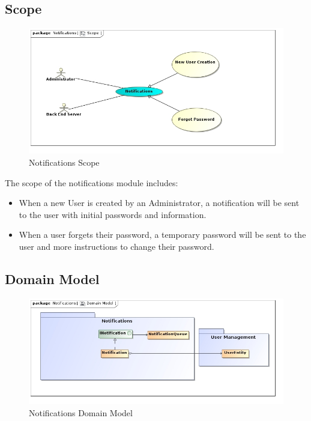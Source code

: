 \documentclass[11pt,a4paper]{article}
\begin{document}
\subsection{Scope}
\begin{figure}[H]
	\begin{center}
		\includegraphics[width=\linewidth]{../Images/Notification Scope.jpg}
		\caption{Notifications Scope}
	\end{center}
\end{figure}
The scope of the notifications module includes:
\begin{itemize}
	\item When a new User is created by an Administrator, a notification will be sent to the user with initial passwords and information.
	\item When a user forgets their password, a temporary password will be sent to the user and more instructions to change their password.
\end{itemize}


\subsection{Domain Model}

\begin{figure}[H]
	\begin{center}
		\includegraphics[width=\linewidth]{../Images/Notifications Domain Model.jpg}
		\caption{Notifications Domain Model}
	\end{center}
\end{figure}
\end{document}
